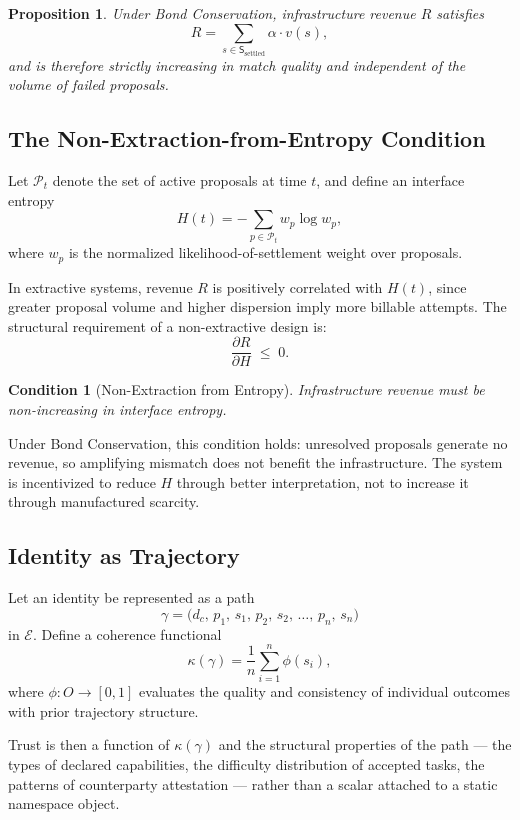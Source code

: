 \documentclass[12pt, a4paper]{article}
\newtheorem{proposition}{Proposition}
\newtheorem{condition}{Condition}
\begin{document}
\begin{proposition}
Under Bond Conservation, infrastructure revenue $R$ satisfies
\[
R = \sum_{s \in \mathsf{S}_{\mathrm{settled}}} \alpha \cdot v(s),
\]
and is therefore strictly increasing in match quality and independent of the
volume of failed proposals.
\end{proposition}

\subsection{The Non-Extraction-from-Entropy Condition}

Let $\mathcal{P}_t$ denote the set of active proposals at time $t$, and define
an interface entropy
\[
H(t) = - \sum_{p \in \mathcal{P}_t} w_p \log w_p,
\]
where $w_p$ is the normalized likelihood-of-settlement weight over proposals.

In extractive systems, revenue $R$ is positively correlated with $H(t)$, since
greater proposal volume and higher dispersion imply more billable attempts. The
structural requirement of a non-extractive design is:
\[
\frac{\partial R}{\partial H} \;\le\; 0.
\]

\begin{condition}[Non-Extraction from Entropy]
Infrastructure revenue must be non-increasing in interface entropy.
\end{condition}

Under Bond Conservation, this condition holds: unresolved proposals generate
no revenue, so amplifying mismatch does not benefit the infrastructure. The
system is incentivized to reduce $H$ through better interpretation, not to
increase it through manufactured scarcity.

\subsection{Identity as Trajectory}

Let an identity be represented as a path
\[
\gamma = \bigl(d_c,\, p_1,\, s_1,\, p_2,\, s_2,\, \ldots,\, p_n,\, s_n\bigr)
\]
in $\mathcal{E}$. Define a coherence functional
\[
\kappa(\gamma) = \frac{1}{n} \sum_{i=1}^{n} \phi(s_i),
\]
where $\phi : O \to [0,1]$ evaluates the quality and consistency of individual
outcomes with prior trajectory structure.

Trust is then a function of $\kappa(\gamma)$ and the structural properties of
the path --- the types of declared capabilities, the difficulty distribution of
accepted tasks, the patterns of counterparty attestation --- rather than a
scalar attached to a static namespace object.
\end{document}
